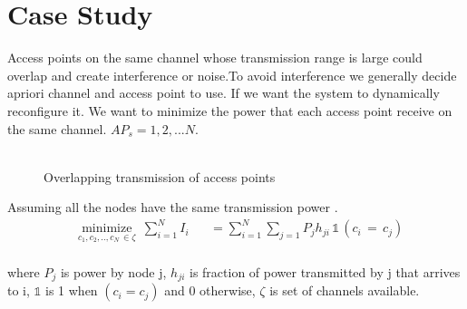 \section{Case Study}
 Access points on the same channel whose transmission range is large could overlap and create interference or noise.To avoid interference we generally decide apriori channel and access point to use. If we want the system to dynamically reconfigure it. We want to minimize the power that each access point receive on the same channel. $AP_s = {1,2,...N}$. \\ \\
 \begin{figure} [ht!]
 \centering
 \caption{Overlapping transmission of access points }
 \end{figure}
 \hfill \break 
  Assuming all the nodes have the same transmission power .\\  
 \begin{equation}
\begin{aligned}
& \underset{c_1, c_2,..,c_N \, \in \zeta}{\text{minimize}}
\, \, \, \sum_{i=1}^{N} I_i 
& &  =\sum_{i=1}^{N} \sum_{j=1} P_j h_{ji}\, \mathds{1} \,(c_i \,= \,c_j) 
\end{aligned}
\end{equation}
\\
where $P_j$  is power by node j, $h_{ji} $ is fraction of power transmitted by j that arrives to i, $\mathds{1}$ is 1 when $(c_i = c_j)$ and 0 otherwise, $\zeta$ is set of channels available.\\ \\

